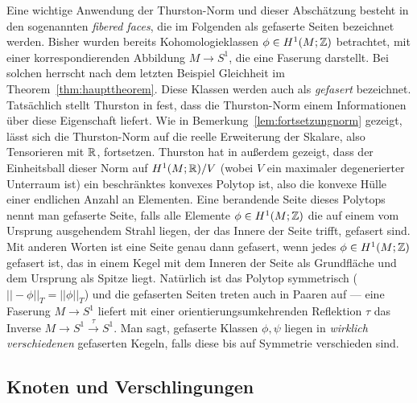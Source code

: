     \begin{bsp}
    \label{ex:fiberedfaces}
        Eine wichtige Anwendung der Thurston-Norm und dieser Abschätzung besteht in den sogenannten \textit{fibered faces}, die im Folgenden als gefaserte Seiten bezeichnet werden. Bisher wurden bereits Kohomologieklassen $\phi \in H^1(M;\mathbb{Z})$ betrachtet, mit einer korrespondierenden Abbildung $M \to S^1$, die eine Faserung darstellt. Bei solchen herrscht nach dem letzten Beispiel Gleichheit im Theorem~\ref{thm:haupttheorem}. Diese Klassen werden auch als \textit{gefasert} bezeichnet. Tatsächlich stellt Thurston in \cite{Thurston.1986} fest, dass die Thurston-Norm einem Informationen über diese Eigenschaft liefert. Wie in Bemerkung~\ref{lem:fortsetzungnorm} gezeigt, lässt sich die Thurston-Norm auf die reelle Erweiterung der Skalare, also Tensorieren mit $\mathbb{R}$, fortsetzen. Thurston hat in \cite{Thurston.1986} außerdem gezeigt, dass der Einheitsball dieser Norm auf $H^1(M;\mathbb{R})/V$ (wobei $V$ ein maximaler degenerierter Unterraum ist) ein beschränktes konvexes Polytop ist, also die konvexe Hülle einer endlichen Anzahl an Elementen. Eine berandende Seite dieses Polytops nennt man gefaserte Seite, falls alle Elemente $\phi \in H^1(M;\mathbb{Z})$ die auf einem vom Ursprung ausgehendem Strahl liegen, der das Innere der Seite trifft, gefasert sind. Mit anderen Worten ist eine Seite genau dann gefasert, wenn jedes $\phi \in H^1(M;\mathbb{Z})$ gefasert ist, das in einem Kegel mit dem Inneren der Seite als Grundfläche und dem Ursprung als Spitze liegt. Natürlich ist das Polytop symmetrisch ($||-\phi||_T=||\phi||_T$) und die gefaserten Seiten treten auch in Paaren auf --- eine Faserung $M \to S^1$ liefert mit einer orientierungsumkehrenden Reflektion $\tau$ das Inverse $M \to S^1 \stackrel \tau \to S^1$. Man sagt, gefaserte Klassen $\phi,\psi$ liegen in \textit{wirklich verschiedenen} gefaserten Kegeln, falls diese bis auf Symmetrie verschieden sind. 
    \end{bsp}


    \subsection{Knoten und Verschlingungen}
    \label{sec:links}


